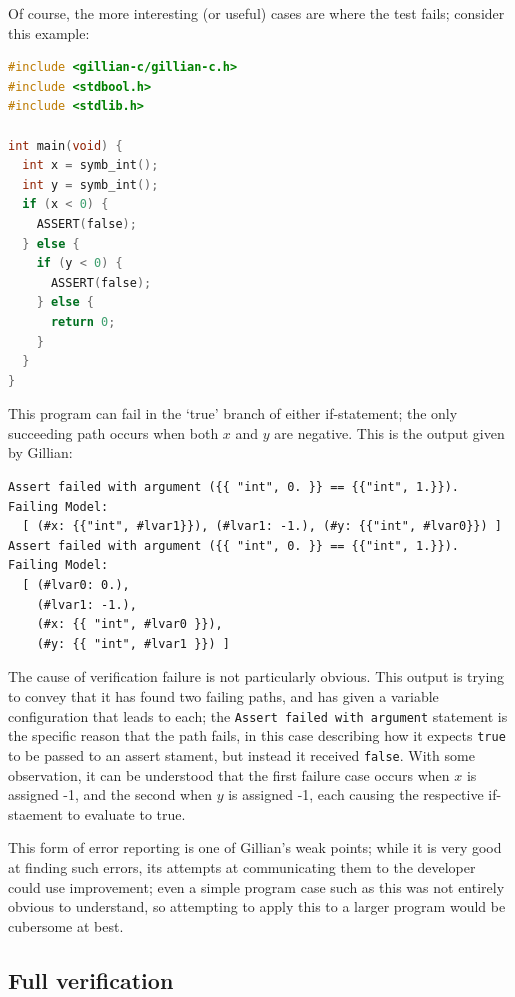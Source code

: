 Of course, the more interesting (or useful) cases are where the test fails; consider this example:

\begin{lstlisting}[caption={Symbolic execution - assertion failure}, style=code, language=C]
#include <gillian-c/gillian-c.h>
#include <stdbool.h>
#include <stdlib.h>

int main(void) {
  int x = symb_int();
  int y = symb_int();
  if (x < 0) {
    ASSERT(false);
  } else {
    if (y < 0) {
      ASSERT(false);
    } else {
      return 0;
    }
  }
}
\end{lstlisting}

This program can fail in the `true' branch of either if-statement; the only succeeding path occurs when both $x$ and $y$ are negative. This is the output given by Gillian:

\begin{lstlisting}[numbers=none, style=terminal, caption={Symbolic execution - assertion failure (Gillian output)}]
Assert failed with argument ({{ "int", 0. }} == {{"int", 1.}}).
Failing Model:
  [ (#x: {{"int", #lvar1}}), (#lvar1: -1.), (#y: {{"int", #lvar0}}) ]
Assert failed with argument ({{ "int", 0. }} == {{"int", 1.}}).
Failing Model:
  [ (#lvar0: 0.),
    (#lvar1: -1.),
    (#x: {{ "int", #lvar0 }}),
    (#y: {{ "int", #lvar1 }}) ]
\end{lstlisting}

The cause of verification failure is not particularly obvious. This output is
trying to convey that it has found two failing paths, and has given a variable
configuration that leads to each; the \texttt{Assert failed with argument}
statement is the specific reason that the path fails, in this case describing
how it expects \texttt{true} to be passed to an assert stament, but instead it received \texttt{false}. With some observation, it can be understood that the first failure case occurs when $x$ is assigned -1, and the second when $y$ is assigned -1, each causing the respective if-staement to evaluate to true.

This form of error reporting is one of Gillian's weak points; while it is very
good at finding such errors, its attempts at communicating them to the
developer could use improvement; even a simple program case such as this was
not entirely obvious to understand, so attempting to apply this to a larger
program would be cubersome at best.

\subsection{Full verification}

